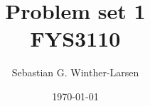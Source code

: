 \documentclass[]{article}
\title{Problem set 1 \\ \large{FYS3110}}
\author{Sebastian G. Winther-Larsen}
\date{\today}
\begin{document}
\
\end{document}
